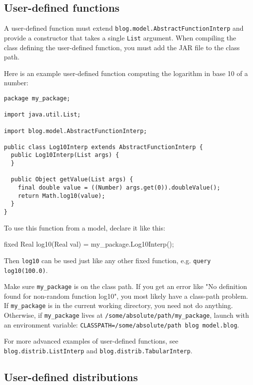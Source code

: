 \subsection{User-defined functions}\label{user-defined-function-section}

A user-defined function must extend \verb|blog.model.AbstractFunctionInterp|
and provide a constructor that takes a single \verb|List| argument. When
compiling the class defining the user-defined function, you must add the \bl
JAR file to the class path.

Here is an example user-defined function computing the logarithm in base 10 of
a number:

\begin{verbatim}
package my_package;

import java.util.List;

import blog.model.AbstractFunctionInterp;

public class Log10Interp extends AbstractFunctionInterp {
  public Log10Interp(List args) {
  }

  public Object getValue(List args) {
    final double value = ((Number) args.get(0)).doubleValue();
    return Math.log10(value);
  }
}
\end{verbatim}

To use this function from a model, declare it like this:

\begin{blogcode}
fixed Real log10(Real val) = my_package.Log10Interp();
\end{blogcode}

Then \verb|log10| can be used just like any other fixed function, e.g.
\verb|query log10(100.0)|.

Make sure \verb|my_package| is on the class path. If you get an error like "No
definition found for non-random function log10", you most likely have a
class-path problem. If \verb|my_package| is in the current working directory,
you need not do anything. Otherwise, if \verb|my_package| lives at
\verb|/some/absolute/path/my_package|, launch \bl with an environment variable:
{\tt CLASSPATH=/some/absolute/path blog model.blog}.

For more advanced examples of user-defined functions, see
\verb|blog.distrib.ListInterp| and \verb|blog.distrib.TabularInterp|.



\subsection{User-defined distributions}\label{user-defined-distribution-section}

